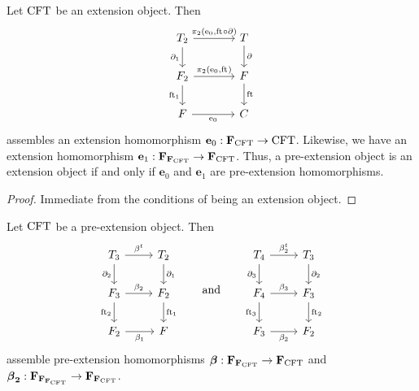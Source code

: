 \begin{lem}
Let $\mathrm{CFT}$ be an extension object. Then
\begin{equation*}
\begin{tikzcd}[column sep=large]
\stesyst_2
  \ar{r}{\pullbackpr{2}{\ectxext}{\eft\circ\ebd}}
  \ar{d}[swap]{\ebd[1]}
  &
\stesyst
  \ar{d}{\ebd}
  \\
\stesysf_2
  \ar{r}{\pullbackpr{2}{\ectxext}{\eft}}
  \ar{d}[swap]{\eft[1]}
  &
\stesysf
  \ar{d}{\eft}
  \\
\stesysf
  \ar{r}[swap]{\ectxext}
  &
\stesysc
\end{tikzcd}
\end{equation*}
assembles an extension homomorphism $\mathbf{e}_0:\mathbf{F}_{\mathrm{CFT}}\to\mathrm{CFT}$.
Likewise, we have an extension homomorphism
$\mathbf{e}_1:\mathbf{F}_{\mathbf{F}_{\mathrm{CFT}}}\to\mathbf{F}_{\mathrm{CFT}}$. Thus, a
pre-extension object is an extension object if and only if $\mathbf{e}_0$
and $\mathbf{e}_1$ are pre-extension homomorphisms.
\end{lem}

\begin{proof}
Immediate from the conditions of being an extension object.
\end{proof}

\begin{defn}
Let $\mathrm{CFT}$ be a pre-extension object. Then
\begin{equation*}
\begin{tikzcd}
\stesyst_3
  \ar{r}{\beta^t}
  \ar{d}[swap]{\ebd[2]}
  &
\stesyst_2
  \ar{d}{\ebd[1]}
  \\
\stesysf_3
  \ar{r}{\beta_2}
  \ar{d}[swap]{\eft[2]}
  &
\stesysf_2
  \ar{d}{\eft[1]}
  \\
\stesysf_2
  \ar{r}[swap]{\beta_1}
  &
\stesysf
\end{tikzcd}
\qquad
\text{and}
\qquad
\begin{tikzcd}
\stesyst_4
  \ar{r}{\beta^t_2}
  \ar{d}[swap]{\ebd[3]}
  &
\stesyst_3
  \ar{d}{\ebd[2]}
  \\
\stesysf_4
  \ar{r}{\beta_3}
  \ar{d}[swap]{\eft[3]}
  &
\stesysf_3
  \ar{d}{\eft[2]}
  \\
\stesysf_3
  \ar{r}[swap]{\beta_2}
  &
\stesysf_2
\end{tikzcd}
\end{equation*}
assemble pre-extension homomorphisms 
\(
\boldsymbol{\beta}
  :
\mathbf{F}_{\mathbf{F}_{\mathrm{CFT}}}
  \to
\mathbf{F}_{\mathrm{CFT}}
\) 
and
\(
\boldsymbol{\beta}_\mathbf{2}
  :
\mathbf{F}_{\mathbf{F}_{\mathbf{F}_{\mathrm{CFT}}}}
  \to
\mathbf{F}_{\mathbf{F}_{\mathrm{CFT}}}
\).
\end{defn}


